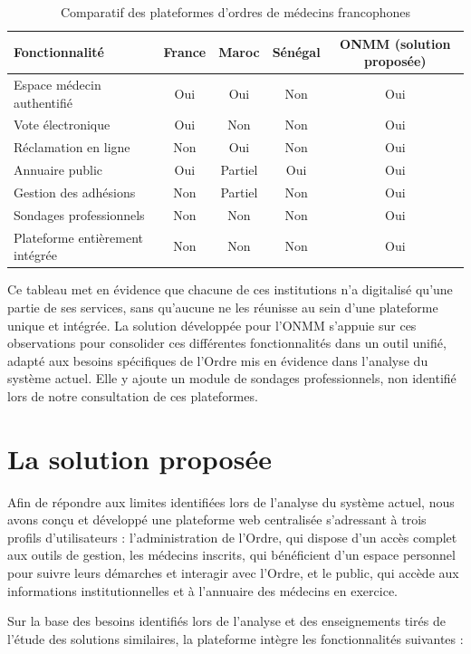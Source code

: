 ﻿\documentclass[12pt,a4paper]{report}
\begin{document}
\begin{table}[H]
\centering
\caption{Comparatif des plateformes d'ordres de médecins francophones}
\label{tab:comparatif-plateformes}
\begin{tabularx}{\textwidth}{|X|c|c|c|c|}
\hline
\textbf{Fonctionnalité} & \textbf{France} & \textbf{Maroc} & \textbf{Sénégal} & \textbf{ONMM (solution proposée)} \\
\hline
Espace médecin authentifié & Oui & Oui & Non & Oui \\
\hline
Vote électronique & Oui & Non & Non & Oui \\
\hline
Réclamation en ligne & Non & Oui & Non & Oui \\
\hline
Annuaire public & Oui & Partiel & Oui & Oui \\
\hline
Gestion des adhésions & Non & Partiel & Non & Oui \\
\hline
Sondages professionnels & Non & Non & Non & Oui \\
\hline
Plateforme entièrement intégrée & Non & Non & Non & Oui \\
\hline
\end{tabularx}
\end{table}

Ce tableau met en évidence que chacune de ces institutions n'a
digitalisé qu'une partie de ses services, sans qu'aucune ne les
réunisse au sein d'une plateforme unique et intégrée. La solution
développée pour l'ONMM s'appuie sur ces observations pour consolider
ces différentes fonctionnalités dans un outil unifié, adapté aux
besoins spécifiques de l'Ordre mis en évidence dans l'analyse du
système actuel. Elle y ajoute un module de sondages professionnels,
non identifié lors de notre consultation de ces plateformes.
\section{La solution proposée}

Afin de répondre aux limites identifiées lors de l'analyse du système
actuel, nous avons conçu et développé une plateforme web centralisée
s'adressant à trois profils d'utilisateurs : l'administration de
l'Ordre, qui dispose d'un accès complet aux outils de gestion, les
médecins inscrits, qui bénéficient d'un espace personnel pour suivre
leurs démarches et interagir avec l'Ordre, et le public, qui accède
aux informations institutionnelles et à l'annuaire des médecins en
exercice.

Sur la base des besoins identifiés lors de l'analyse et des
enseignements tirés de l'étude des solutions similaires, la
plateforme intègre les fonctionnalités suivantes :
\end{document}
